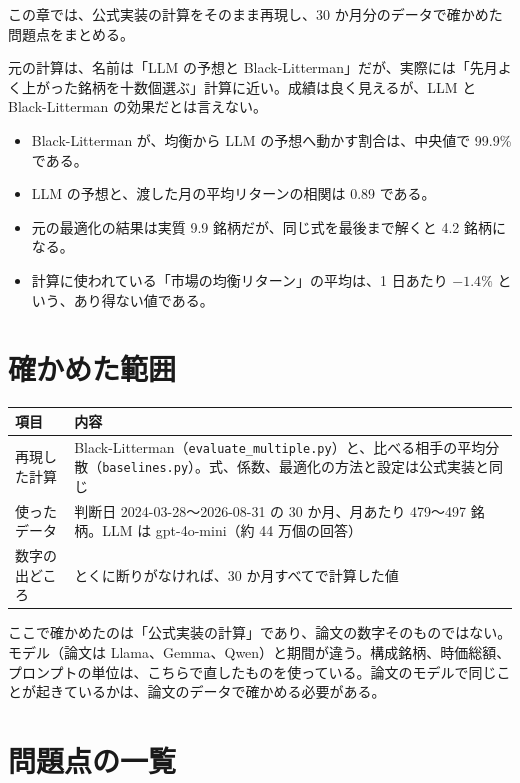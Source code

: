 \documentclass[xelatex,ja=standard,jafont=hiragino-pron,a4paper,10pt]{bxjsreport}
\newcommand{\code}[1]{\texttt{#1}}
\begin{document}
この章では、公式実装の計算をそのまま再現し、30 か月分のデータで確かめた問題点をまとめる。

\begin{keybox}
元の計算は、名前は「LLM の予想と Black-Litterman」だが、実際には「先月よく上がった銘柄を十数個選ぶ」計算に近い。成績は良く見えるが、LLM と Black-Litterman の効果だとは言えない。
\begin{itemize}
\item Black-Litterman が、均衡から LLM の予想へ動かす割合は、中央値で 99.9\% である。
\item LLM の予想と、渡した月の平均リターンの相関は 0.89 である。
\item 元の最適化の結果は実質 9.9 銘柄だが、同じ式を最後まで解くと 4.2 銘柄になる。
\item 計算に使われている「市場の均衡リターン」の平均は、1 日あたり $-1.4\%$ という、あり得ない値である。
\end{itemize}
\end{keybox}

\section{確かめた範囲}

\begin{longtable}{p{3.40cm}p{11.00cm}}
\toprule
\textbf{項目} & \textbf{内容} \\
\midrule
\endfirsthead
\bottomrule
\endfoot
再現した計算 & Black-Litterman（\code{evaluate\_multiple.py}）と、比べる相手の平均分散（\code{baselines.py}）。式、係数、最適化の方法と設定は公式実装と同じ \\
使ったデータ & 判断日 2024-03-28〜2026-08-31 の 30 か月、月あたり 479〜497 銘柄。LLM は gpt-4o-mini（約 44 万個の回答） \\
数字の出どころ & とくに断りがなければ、30 か月すべてで計算した値 \\
\end{longtable}

\begin{notebox}
ここで確かめたのは「公式実装の計算」であり、論文の数字そのものではない。モデル（論文は Llama、Gemma、Qwen）と期間が違う。構成銘柄、時価総額、プロンプトの単位は、こちらで直したものを使っている。論文のモデルで同じことが起きているかは、論文のデータで確かめる必要がある。
\end{notebox}

\section{問題点の一覧}
\end{document}
